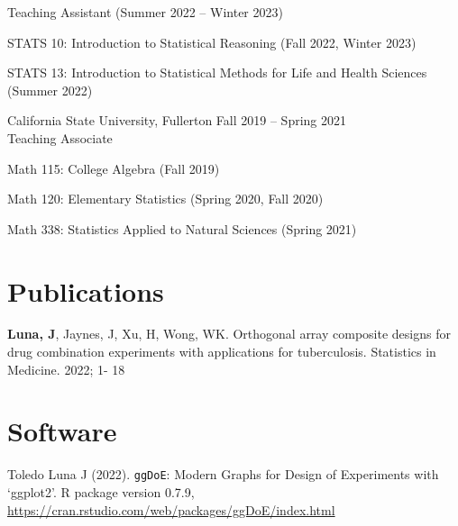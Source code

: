 \documentclass[margin,line]{res}
\newenvironment{list1}{
  \begin{list}{\ding{113}}{
      \setlength{\itemsep}{0in}
      \setlength{\parsep}{0in} \setlength{\parskip}{0in}
      \setlength{\topsep}{0in} \setlength{\partopsep}{0in} 
      \setlength{\leftmargin}{0.20in}}}{\end{list}}
\begin{document}
\begin{resume}
Teaching Assistant (Summer 2022 -- Winter 2023)\\[-0.3cm]
\begin{list1}
	\item[] STATS 10: Introduction to Statistical Reasoning \hspace{1ex} (Fall 2022, Winter 2023)
	\item[] STATS 13: Introduction to Statistical Methods for Life 
and Health Sciences \hspace{1ex} (Summer 2022)
\end{list1}

{\sc California State University, Fullerton} \hfill{Fall 2019 -- Spring 2021} \\ Teaching Associate\\[-0.3cm]
\begin{list1}
	\item[] Math 115: College Algebra \hspace{1ex} (Fall 2019)
	\item[] Math 120: Elementary Statistics  \hspace{1ex} (Spring 2020, Fall 2020)
	\item[] Math 338: Statistics Applied to Natural Sciences  \hspace{1ex} (Spring 2021)
\end{list1}

\vspace{1ex}

\section{\sc Publications}
\begin{list1}
\item[] \textbf{Luna, J}, Jaynes, J, Xu, H, Wong, WK. Orthogonal array composite designs for drug combination experiments with applications for tuberculosis. Statistics in Medicine. 2022; 1- 18
\end{list1}

\vspace{1ex}

\section{\sc Software}
\begin{list1}
\item[] Toledo Luna J (2022). \verb|ggDoE|: Modern Graphs for Design of Experiments
  with `ggplot2'. R package version 0.7.9,
  \url{https://cran.rstudio.com/web/packages/ggDoE/index.html}
\end{list1}




\end{resume}
\end{document}
